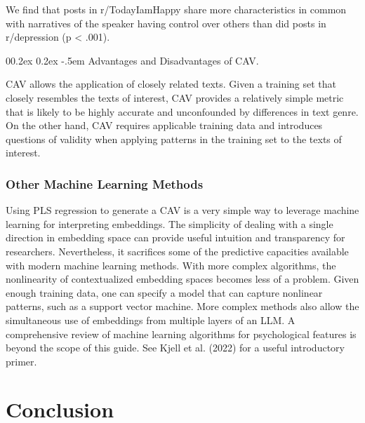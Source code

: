 \documentclass[
  man,
  floatsintext,
  longtable,
  nolmodern,
  notxfonts,
  notimes,
  colorlinks=true,linkcolor=blue,citecolor=blue,urlcolor=blue]{apa7}
\makeatletter
\renewcommand{\paragraph}{\@startsection{paragraph}{4}{\parindent}%
	{0\baselineskip \@plus 0.2ex \@minus 0.2ex}%
	{-.5em}%
	{\normalfont\normalsize\bfseries\typesectitle}}
\makeatother
\begin{document}
We find that posts in r/TodayIamHappy share more characteristics in
common with narratives of the speaker having control over others than
did posts in r/depression (p \textless{} .001).

\paragraph{Advantages and Disadvantages of
CAV.}\label{advantages-and-disadvantages-of-cav}

CAV allows the application of closely related texts. Given a training
set that closely resembles the texts of interest, CAV provides a
relatively simple metric that is likely to be highly accurate and
unconfounded by differences in text genre. On the other hand, CAV
requires applicable training data and introduces questions of validity
when applying patterns in the training set to the texts of interest.

\subsubsection{Other Machine Learning
Methods}\label{other-machine-learning-methods}

Using PLS regression to generate a CAV is a very simple way to leverage
machine learning for interpreting embeddings. The simplicity of dealing
with a single direction in embedding space can provide useful intuition
and transparency for researchers. Nevertheless, it sacrifices some of
the predictive capacities available with modern machine learning
methods. With more complex algorithms, the nonlinearity of
contextualized embedding spaces becomes less of a problem. Given enough
training data, one can specify a model that can capture nonlinear
patterns, such as a support vector machine. More complex methods also
allow the simultaneous use of embeddings from multiple layers of an LLM.
A comprehensive review of machine learning algorithms for psychological
features is beyond the scope of this guide. See Kjell et al. (2022) for
a useful introductory primer.

\section{Conclusion}\label{conclusion}
\end{document}

